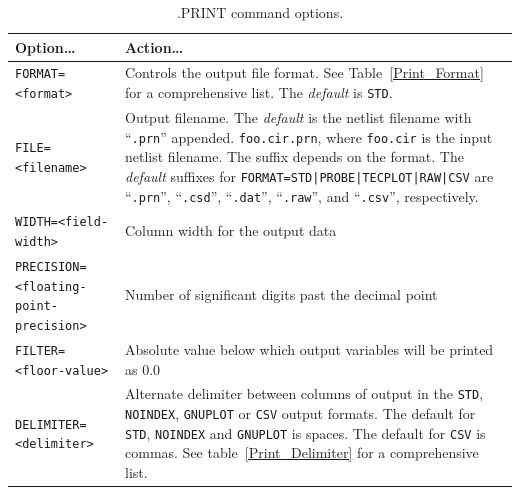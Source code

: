 \begin{table}[!htb]
  \caption[.PRINT command options.]{.PRINT command options.}
\label{Print_Commands}
  \begin{tabularx}{\linewidth}{|>{\setlength{\hsize}{1.0\hsize}}Y|
      >{\setlength{\hsize}{1.0\hsize}}Y|}
     \color{white}\bf Option\ldots &
    \color{white}\bf Action\ldots \\ \hline

    \texttt{FORMAT=<format>} &
    Controls the output file format.  See Table~\ref{Print_Format} for a comprehensive list.  
      The {\em default} is \texttt{STD}. \\ \hline

    \texttt{FILE=<filename>} & Output filename. The {\em default} is the
    netlist filename with ``\texttt{.prn}'' appended. \newline 
    \texttt{foo.cir.prn}, where \texttt{foo.cir} is the input netlist
  filename. The suffix depends on the format.  The {\em default} suffixes for \texttt{FORMAT=STD|PROBE|TECPLOT|RAW|CSV} 
  are ``\texttt{.prn}'', ``\texttt{.csd}'', ``\texttt{.dat}'', ``\texttt{.raw}'', and ``\texttt{.csv}'', respectively.  \\ \hline

    \texttt{WIDTH=<field-width>} & Column width for the output data \\ \hline

    \texttt{PRECISION=}\newline \texttt{<floating-point-precision>} & Number of
    significant digits past the decimal point \\ \hline

    \texttt{FILTER=<floor-value>} & Absolute value below which output
    variables will be printed as 0.0 \\ \hline

    \texttt{DELIMITER=<delimiter>} & Alternate delimiter between columns
    of output in the \texttt{STD}, \texttt{NOINDEX}, \texttt{GNUPLOT} or \texttt{CSV} output formats. The default for \texttt{STD}, \texttt{NOINDEX} and \texttt{GNUPLOT} is spaces. The default for \texttt{CSV} is commas. See table~\ref{Print_Delimiter} for a comprehensive list. \\ \hline

  \end{tabularx}

\end{table}

